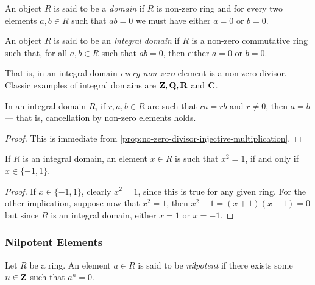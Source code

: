 %
\begin{definition}[Domain]
\label{def:domain}
An object \(R\) is said to be a \emph{domain} if \(R\) is non-zero ring and for
every two elements \(a, b \in R\) such that \(a b = 0\) we must have either
\(a = 0\) or \(b = 0\).
\end{definition}
%

%
\begin{definition}
\label{def:integral-domain}
An object \(R\) is said to be an \emph{integral domain} if \(R\) is a non-zero
commutative ring such that, for all \(a, b \in R\) such that \(a b = 0\), then
either \(a = 0\) or \(b = 0\).
\end{definition}
%

That is, in an integral domain \emph{every non-zero} element is a
non-zero-divisor. Classic examples of integral domains are \(\mathbf{Z}, \mathbf{Q}, \mathbf{R}\) and
\(\mathbf{C}\).

%
\begin{corollary}
\label{cor:cancellation-integral-domain}
In an integral domain \(R\), if \(r, a, b \in R\) are such that \(r a = r b\)
and \(r \neq 0\), then \(a = b\) --- that is, cancellation by non-zero elements
holds.
\end{corollary}
%

%
\begin{proof}
This is immediate from \cref{prop:no-zero-divisor-injective-multiplication}.
\end{proof}
%


%
\begin{corollary}
\label{cor:idempotent-in-integral-domain}
If \(R\) is an integral domain, an element \(x \in R\) is such that \(x^2 = 1\),
if and only if \(x \in \{-1, 1\}\).
\end{corollary}
%

%
\begin{proof}
If \(x \in \{-1, 1\}\), clearly \(x^2 = 1\), since this is true for any given
ring. For the other implication, suppose now that \(x^2 = 1\), then \(x^2 - 1 =
(x + 1) (x - 1) = 0\) but since \(R\) is an integral domain, either \(x = 1\) or
\(x = -1\).
\end{proof}
%

\subsubsection{Nilpotent Elements}

%
\begin{definition}[Nilpotent]
\label{def:nilpotent}
Let \(R\) be a ring. An element \(a \in R\) is said to be \emph{nilpotent} if
there exists some \(n \in \mathbf{Z}\) such that \(a^n = 0\).
\end{definition}
%

